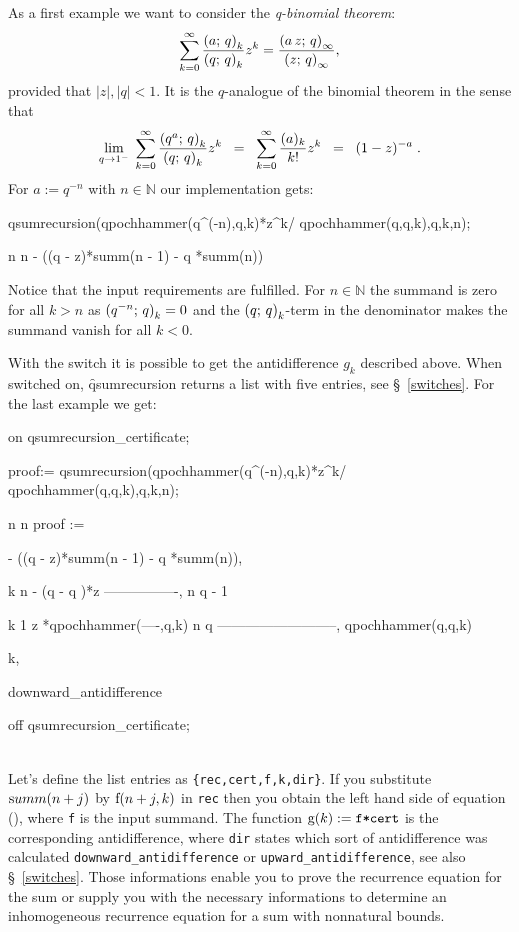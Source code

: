 As a first example we want to consider the {\sl q-binomial theorem}:
\[
	\sum_{k=0}^\infty{\frac{\left(a;\,q\right)_{k}}{\left(q;\,q\right)_{k}}z^k} =
	\frac{\left(a\,z;\,q\right)_{\infty}}{\left(z;\,q\right)_{\infty}},
\]
provided that $|z|,|q|<1$.
It is the $q$-analogue of the binomial theorem in the sense that
\[
	\lim_{q\rightarrow{}1^-}\;{\sum_{k=0}^\infty{
	\frac{\left(q^a;\,q\right)_{k}}{\left(q;\,q\right)_{k}}z^k}} \;\;=\;\;
	\sum_{k=0}^\infty{\frac{(a)_k}{k!}z^k} \;\;=\;\; (1-z)^{-a}\;.
\]
For $a:=q^{-n}$ with $n\in\mathbb{N}$ our implementation gets:
\begin{redoutput}
\redprompt qsumrecursion(qpochhammer(q^(-n),q,k)*z^k/
   qpochhammer(q,q,k),q,k,n);

      n                     n
 - ((q  - z)*summ(n - 1) - q *summ(n))
\end{redoutput}
%
Notice that the input requirements are fulfilled. For $n\in\mathbb{N}$ the
summand is zero for all $k>n$ as $\left(q^{-n};\,q\right)_{k}=0$ and
the $\left(q;\,q\right)_{k}$-term in the denominator makes the summand
vanish for all $k<0$.

With the switch  it is possible
to get the antidifference $g_k$ described above. When switched
on, \f{qsumrecursion} returns a list with five entries,
see \S~\ref{switches}. For the
last example we get:

\begin{redoutput}
\redprompt on qsumrecursion_certificate;

\redprompt proof:= qsumrecursion(qpochhammer(q^(-n),q,k)*z^k/
    qpochhammer(q,q,k),q,k,n);

                n                     n
proof := { - ((q  - z)*summ(n - 1) - q *summ(n)),

                k    n
            - (q  - q )*z
          ----------------,
                n
               q  - 1

            k              1
           z *qpochhammer(----,q,k)
                            n
                           q
          --------------------------,
              qpochhammer(q,q,k)

          k,

          downward_antidifference}

\redprompt off qsumrecursion_certificate;
\end{redoutput}
%
\\[-2.5ex]\noindent{}
Let's define the list entries as \texttt{\{rec,cert,f,k,dir\}}. If you
substitute ${\mathrm summ}(n+j)$ by ${\mathrm f}(n+j,k)$ in \texttt{rec} then
you obtain the left hand side of equation (),
where \texttt{f} is the input summand. The function
${\mathrm g}(k):=\texttt{f*cert}$ is the corresponding
antidifference, where \texttt{dir} states which sort of antidifference
was calculated \texttt{downward\_antidifference} or
\texttt{upward\_antidifference}, see also \S~\ref{switches}.
Those informations enable you to prove the recurrence equation for
the sum or supply you with the necessary informations to determine
an inhomogeneous recurrence equation for a sum with nonnatural bounds.

